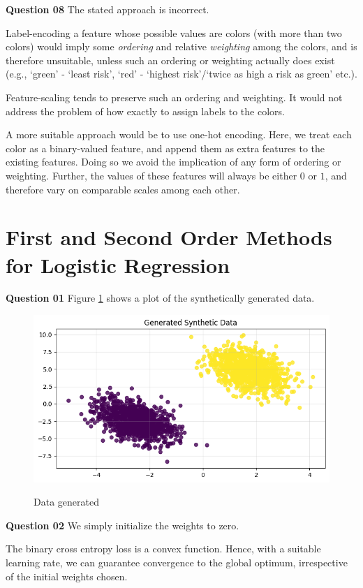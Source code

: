 \documentclass{article}[a4paper]
\begin{document}
	\textbf{Question 08} The stated approach is incorrect.
	
	Label-encoding a feature whose possible values are colors (with more than two colors) would imply some \textit{ordering} and relative \textit{weighting} among the colors, and is therefore unsuitable, unless such an ordering or weighting actually does exist (e.g., `green' - `least risk', `red' - `highest risk'/`twice as high a risk as green' etc.).
	
	Feature-scaling tends to preserve such an ordering and weighting. It would not address the problem of how exactly to assign labels to the colors.

	A more suitable approach would be to use one-hot encoding. Here, we treat each color as a binary-valued feature, and append them as extra features to the existing features. Doing so we avoid the implication of any form of ordering or weighting. Further, the values of these features will always be either $0$ or $1$, and therefore vary on comparable scales among each other.

	\section{First and Second Order Methods for Logistic Regression}

	\textbf{Question 01} Figure \ref{q3_1} shows a plot of the synthetically generated data.

	\begin{figure}[H]
		\centering
		\includegraphics[width=0.8\linewidth]{images/q3_1.png}
		\label{q3_1}
		\caption{Data generated}
	\end{figure}

	\textbf{Question 02} We simply initialize the weights to zero.
	
	The binary cross entropy loss is a convex function. Hence, with a suitable learning rate, we can guarantee convergence to the global optimum, irrespective of the initial weights chosen.
	
\end{document}
